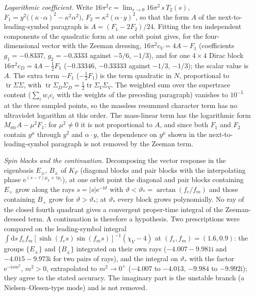 \emph{Logarithmic coefficient.} Write \(16\pi^2c=\lim_{s\to0}16\pi^2\,s\,T_2(s)\), \(F_1=y^2\bigl((\kappa\cdot\alpha)^2-\kappa^2\alpha^2\bigr)\), \(F_2=\kappa^2(\alpha\cdot y)^2\), so that the form \(A\) of the next-to-leading-symbol paragraph is \(A=(F_1-2F_2)/24\). Fitting the ten independent components of the quadratic form at one orbit point gives, for the four-dimensional vector with the Zeeman dressing, \(16\pi^2c_V=4A-F_1\) (coefficients \(g_1=-0.8337\), \(g_2=-0.3333\) against \(-5/6\), \(-1/3\)), and for one \(4\times4\) Dirac block \(16\pi^2c_D=4A-\tfrac12F_1\) (\(-0.33346\), \(-0.33333\) against \(-1/3\), \(-1/3\)); the scalar value is \(A\). The extra term \(-F_1\) (\(-\tfrac12F_1\)) is the term quadratic in \(N\), proportional to \(\operatorname{tr}\Sigma\Sigma\), with \(\operatorname{tr}\Sigma_D\Sigma_D=\tfrac12\operatorname{tr}\Sigma_V\Sigma_V\). The weighted sum over the supertrace content (\(\sum_iw_ic_i\) with the weights of the preceding paragraph) vanishes to \(10^{-5}\) at the three sampled points, so the massless resummed character term has no ultraviolet logarithm at this order. The mass-linear term has the logarithmic form \(M_{\mathrm{str}}A-\mu^2F_1\): for \(\mu^2\ne0\) it is not proportional to \(A\), and since both \(F_1\) and \(F_2\) contain \(y^\mu\) through \(y^2\) and \(\alpha\cdot y\), the dependence on \(y^\mu\) shown in the next-to-leading-symbol paragraph is not removed by the Zeeman term.

\emph{Spin blocks and the continuation.} Decomposing the vector response in the eigenbasis \(E_\pm\), \(B_\pm\) of \(K_F\) (diagonal blocks and pair blocks with the interpolating phase \(\mathrm e^{(s-\tau)\mu_k+\tau\mu_l}\)), at one orbit point the diagonal and pair blocks containing \(E_+\) grow along the rays \(s=|s|\mathrm e^{-\mathrm i\vartheta}\) with \(\vartheta<\vartheta_*=\arctan(f_e/f_m)\) and those containing \(B_+\) grow for \(\vartheta>\vartheta_*\); at \(\vartheta_*\) every block grows polynomially. No ray of the closed fourth quadrant gives a convergent proper-time integral of the Zeeman-dressed term. A continuation is therefore a hypothesis. Two prescriptions were compared on the leading-symbol integral \(\int\mathrm ds\,f_ef_m[\sinh(f_es)\sin(f_ms)]^{-1}(\chi_V-4)\) at \((f_e,f_m)=(1.6,0.9)\): the groups \(\{E_\pm\}\) and \(\{B_\pm\}\) integrated on their own rays (\(-4.007-9.981\mathrm i\) and \(-4.015-9.973\mathrm i\) for two pairs of rays), and the integral on \(\vartheta_*\) with the factor \(\mathrm e^{-\mathrm ism^2}\), \(m^2>0\), extrapolated to \(m^2\to0^+\) (\(-4.007\) to \(-4.013\), \(-9.984\) to \(-9.992\mathrm i\)); they agree to the stated accuracy. The imaginary part is the unstable branch (a Nielsen--Olesen-type mode) and is not removed.

